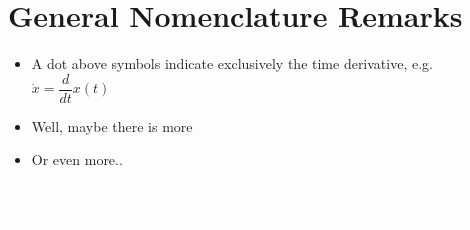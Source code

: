 \section*{General Nomenclature Remarks}
\vspace{0.1cm}
\begin{itemize}
\item A dot above symbols indicate exclusively the time derivative, e.g. $\dot{x} = \dfrac{d}{dt}x(t)$
\item Well, maybe there is more
\item Or even more..
\end{itemize}

\textcolor{white}{\gls{analytic_func} \gls{rational_func} \gls{proper_func} \gls{injective_func} \gls{surjective_func} \gls{bijective_func} \gls{lipschitz} \gls{compact_space} \gls{hurwitz} \gls{dimension} \gls{order}}
